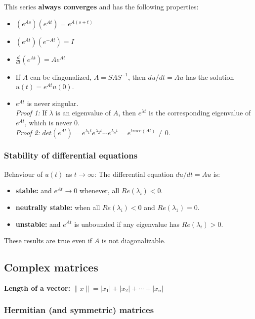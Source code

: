 This series \textbf{always converges} and has the following properties:\\
\begin{itemize}
\item $(e^{As})(e^{At}) = e^{A(s+t)}$\\
\item $(e^{At})(e^{-At}) = I$\\
\item $\frac{d}{dt}(e^{At}) = Ae^{At}$
\item If $A$ can be diagonalized, $A = S\Lambda S^{-1}$, then $du/dt = Au$ has the solution $u(t) = e^{At}u(0)$.\\
\item $e^{At}$ is never singular.\\
\textit{Proof 1:} If $\lambda$ is an eigenvalue of $A$, then $e^{\lambda t}$ is the corresponding eigenvalue of $e^{At}$, which is never 0.\\
\textit{Proof 2:} $det(e^{At}) = e^{\lambda_1 t}e^{\lambda_2 t}\cdots e^{\lambda_n t} = e^{trace(At)} \neq 0$.
\end{itemize}


\subsubsection{Stability of differential equations}
Behaviour of $u(t)$ as $t \to \infty$:
The differential equation $du/dt = Au$ is:\\
\begin{itemize}
\item \textbf{stable:} and $e^{At} \to 0$ whenever, all $Re(\lambda_i) < 0$.	
\item \textbf{neutrally stable:} when all $Re(\lambda_i) < 0$ and $Re(\lambda_1) = 0$.
\item \textbf{unstable:} and $e^{At}$ is unbounded if any eigenvalue has $Re(\lambda_i) > 0$.
\end{itemize}
These results are true even if $A$ is not diagonalizable.


\subsection{Complex matrices}

\textbf{Length of a vector:} $\|x\| = |x_1| + |x_2| + \cdots + |x_n|$\\

\subsubsection{Hermitian (and symmetric) matrices}

